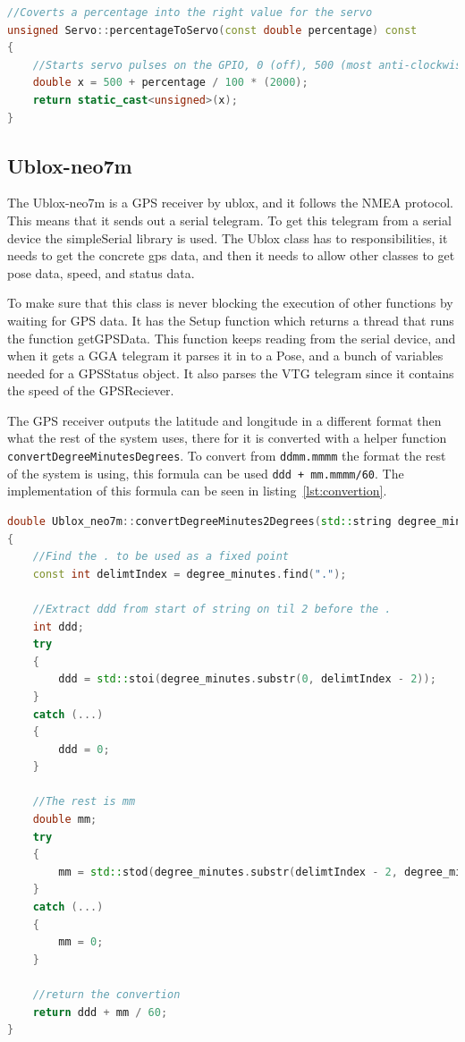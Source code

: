 \begin{lstlisting}[caption = {Percentage to servo periode convertion function}, captionpos=b, label={lst:percent2servo}, language=C++,firstnumber=1]
//Coverts a percentage into the right value for the servo
unsigned Servo::percentageToServo(const double percentage) const
{
	//Starts servo pulses on the GPIO, 0 (off), 500 (most anti-clockwise) to 2500 (most clockwise). 
	double x = 500 + percentage / 100 * (2000); 
	return static_cast<unsigned>(x);
}
\end{lstlisting}

\subsection{Ublox-neo7m}
The Ublox-neo7m is a GPS receiver by ublox, and it follows the NMEA protocol. This means that it sends out a serial telegram. To get this telegram from a serial device the simpleSerial library is used\cite{simple_serial}. The Ublox class has to responsibilities, it needs to get the concrete gps data, and then it needs to allow other classes to get pose data, speed, and status data. 

To make sure that this class is never blocking the execution of other functions by waiting for GPS data. It has the Setup function which returns a thread that runs the function getGPSData. This function keeps reading from the serial device, and when it gets a GGA telegram it parses it in to a Pose, and a bunch of variables needed for a GPSStatus object. It also parses the VTG telegram since it contains the speed of the GPSReciever. 

The GPS receiver outputs the latitude and longitude in a different format then what the rest of the system uses, there for it is converted with a helper function \texttt{convert\-Degree\-Minutes\-Degrees}. To convert from \texttt{ddmm.mmmm} the format the rest of the system is using, this formula can be used \texttt{ddd + mm.mmmm/60}\cite{convertion}. The implementation of this formula can be seen in listing~\ref{lst:convertion}.


\begin{lstlisting}[caption = {Convertion between latitude longitude formats}, captionpos=b, label={lst:convertion}, language=C++,firstnumber=1]
double Ublox_neo7m::convertDegreeMinutes2Degrees(std::string degree_minutes) const
{
	//Find the . to be used as a fixed point
	const int delimtIndex = degree_minutes.find(".");
	
	//Extract ddd from start of string on til 2 before the .
	int ddd;
	try
	{
		ddd = std::stoi(degree_minutes.substr(0, delimtIndex - 2));
	}
	catch (...)
	{
		ddd = 0;
	}
	
	//The rest is mm
	double mm;
	try
	{
		mm = std::stod(degree_minutes.substr(delimtIndex - 2, degree_minutes.length() - 1));
	}
	catch (...)
	{
		mm = 0;
	}
	
	//return the convertion
	return ddd + mm / 60;
}
\end{lstlisting}

